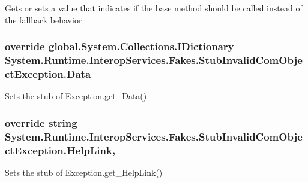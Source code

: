 Gets or sets a value that indicates if the base method should be called instead of the fallback behavior

\hypertarget{class_system_1_1_runtime_1_1_interop_services_1_1_fakes_1_1_stub_invalid_com_object_exception_a715ab0e94676e29c61f2feb318b44dcc}{
\subsubsection[{Data}]{\setlength{\rightskip}{0pt plus 5cm}override global.\-System.\-Collections.\-I\-Dictionary System.\-Runtime.\-Interop\-Services.\-Fakes.\-Stub\-Invalid\-Com\-Object\-Exception.\-Data\hspace{0.3cm}{\ttfamily [get]}}}\label{class_system_1_1_runtime_1_1_interop_services_1_1_fakes_1_1_stub_invalid_com_object_exception_a715ab0e94676e29c61f2feb318b44dcc}


Sets the stub of Exception.\-get\-\_\-\-Data()

\hypertarget{class_system_1_1_runtime_1_1_interop_services_1_1_fakes_1_1_stub_invalid_com_object_exception_a8492dfb18a4abafd969a29eefd13ea4e}{
\subsubsection[{Help\-Link}]{\setlength{\rightskip}{0pt plus 5cm}override string System.\-Runtime.\-Interop\-Services.\-Fakes.\-Stub\-Invalid\-Com\-Object\-Exception.\-Help\-Link\hspace{0.3cm}{\ttfamily [get]}, {\ttfamily [set]}}}\label{class_system_1_1_runtime_1_1_interop_services_1_1_fakes_1_1_stub_invalid_com_object_exception_a8492dfb18a4abafd969a29eefd13ea4e}


Sets the stub of Exception.\-get\-\_\-\-Help\-Link()

